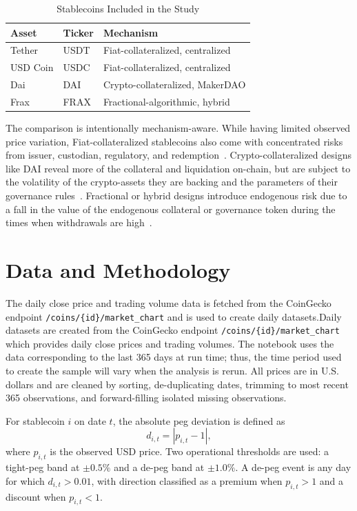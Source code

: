 \documentclass[conference]{IEEEtran}
\begin{document}
\begin{table}[t]
\caption{Stablecoins Included in the Study}
\label{tab:assets}
\centering
\begin{tabular}{lll}
\toprule
Asset & Ticker & Mechanism \\
\midrule
Tether & USDT & Fiat-collateralized, centralized \\
USD Coin & USDC & Fiat-collateralized, centralized \\
Dai & DAI & Crypto-collateralized, MakerDAO \\
Frax & FRAX & Fractional-algorithmic, hybrid \\
\bottomrule
\end{tabular}
\end{table}

The comparison is intentionally mechanism-aware. While having limited observed price variation, Fiat-collateralized stablecoins also come with concentrated risks from issuer, custodian, regulatory, and redemption~\cite{arner_auer_frost_2020_stablecoins,pwg_2021_stablecoins}. Crypto-collateralized designs like DAI reveal more of the collateral and liquidation on-chain, but are subject to the volatility of the crypto-assets they are backing and the parameters of their governance rules~\cite{kozhan_2021_dai}. Fractional or hybrid designs introduce endogenous risk due to a fall in the value of the endogenous collateral or governance token during the times when withdrawals are high~\cite{adams_ibert_2022_runs}.

\section{Data and Methodology}
The daily close price and trading volume data is fetched from the CoinGecko endpoint \texttt{/coins/\{id\}/market\_chart} \cite{coingecko_api} and is used to create daily datasets.Daily datasets are created from the CoinGecko endpoint \texttt{/coins/\{id\}/market\_chart} which provides daily close prices and trading volumes. The notebook uses the data corresponding to the last 365 days at run time; thus, the time period used to create the sample will vary when the analysis is rerun. All prices are in U.S. dollars and are cleaned by sorting, de-duplicating dates, trimming to most recent 365 observations, and forward-filling isolated missing observations.

For stablecoin $i$ on date $t$, the absolute peg deviation is defined as
\begin{equation}
d_{i,t} = |p_{i,t} - 1|,
\end{equation}
where $p_{i,t}$ is the observed USD price.  Two operational thresholds are used: a tight-peg band at $\pm0.5\%$ and a de-peg band at $\pm1.0\%$. A de-peg event is any day for which $d_{i,t}>0.01$, with direction classified as a premium when $p_{i,t}>1$ and a discount when $p_{i,t}<1$.
\end{document}
